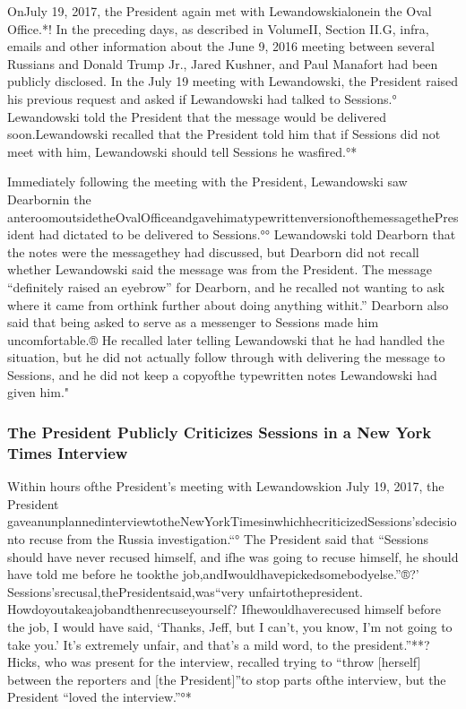 {OnJuly 19, 2017, the President again met with Lewandowskialonein the Oval Office.*!
In the preceding days, as described in VolumeII, Section II.G, infra, emails and other information about the June 9, 2016 meeting between several Russians and Donald Trump Jr., Jared Kushner, and Paul Manafort had been publicly disclosed.
In the July 19 meeting with Lewandowski, the President raised his previous request and asked if Lewandowski had talked to Sessions.°
Lewandowski told the President that the message would be delivered soon.Lewandowski recalled that the President told him that if Sessions did not meet with him, Lewandowski should tell Sessions he wasfired.°*

Immediately following the meeting with the President, Lewandowski saw Dearbornin the anteroomoutsidetheOvalOfficeandgavehimatypewrittenversionofthemessagethePresident had dictated to be delivered to Sessions.°°
Lewandowski told Dearborn that the notes were the messagethey had discussed, but Dearborn did not recall whether Lewandowski said the message was from the President.
The message “definitely raised an eyebrow” for Dearborn, and he recalled not wanting to ask where it came from orthink further about doing anything withit.”
Dearborn also said that being asked to serve as a messenger to Sessions made him uncomfortable.®
He recalled later telling Lewandowski that he had handled the situation, but he did not actually follow through with delivering the message to Sessions, and he did not keep a copyofthe typewritten notes Lewandowski had given him."

\subsubsection{The President Publicly Criticizes Sessions in a New York Times Interview}

Within hours ofthe President’s meeting with Lewandowskion July 19, 2017, the President gaveanunplannedinterviewtotheNewYorkTimesinwhichhecriticizedSessions’sdecisionto recuse from the Russia investigation.“°
The President said that “Sessions should have never recused himself, and ifhe was going to recuse himself, he should have told me before he tookthe
job,andIwouldhavepickedsomebodyelse.”®?'
Sessions’srecusal,thePresidentsaid,was“very unfairtothepresident.
Howdoyoutakeajobandthenrecuseyourself?
Ifhewouldhaverecused himself before the job, I would have said, ‘Thanks, Jeff, but I can’t, you know, I’m not going to take you.’
It’s extremely unfair, and that’s a mild word, to the president.”**?
Hicks, who was present for the interview, recalled trying to “throw [herself] between the reporters and [the President]”to stop parts ofthe interview, but the President “loved the interview.”°*

}

